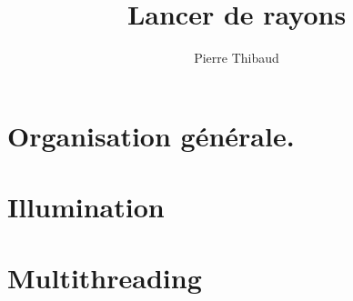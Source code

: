 \documentclass[10pt,a4paper]{beamer}
\author{Pierre \bsc{Donat-Bouillud} Thibaud \bsc{Ehret}}
\title{Lancer de rayons}
\begin{document}
\section{Organisation générale.}


\section{Illumination}


\section{Multithreading} %


%
\end{document}
